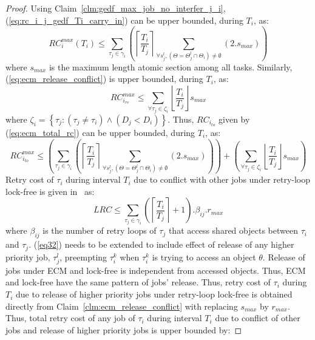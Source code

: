 \begin{proof}\normalfont
%
Using Claim~\ref{clm:gedf_max_job_no_interfer_j_i}, (\ref{eq:rc_i_j_gedf_Ti_carry_in}) can be upper bounded, during $T_i$, as:
%
\begin{equation*}
RC_{i}^{max}\left(T_{i}\right) \le \sum_{\tau_{j}\in\gamma_{i}}\left(\left\lceil\frac{T_{i}}{T_{j}}\right\rceil\sum_{\forall s_{j}^{l}, \left(\Theta=\Theta_j^l \cap \Theta_i\right) \neq \emptyset}\left(2.s_{max}\right)\right)
\label{eq30}
\end{equation*}
%
where $s_{max}$ is the maximum length atomic section among all tasks. Similarly, (\ref{eq:ecm_release_conflict}) is upper bounded, during $T_i$, as:
%
\begin{equation*}
RC_{i_{re}}^{max} \le \sum_{\forall \tau_j \in \zeta_i} \left\lfloor \frac{T_i}{T_j}\right\rfloor s_{max}
\label{eq:ecm_release_conflict_stm_comp}
\end{equation*}
%
where $\zeta_i=\left\{ \tau_j : \left(\tau_j \neq \tau_i \right) \wedge \left( D_j < D_i \right)\right\}$. Thus, $RC_{i_{to}}$ given by (\ref{eq:ecm_total_rc}) can be upper bounded, during $T_i$, as:
\begin{equation}
RC_{i_{to}}^{max} \le \left(\sum_{\tau_{j}\in\gamma_{i}}\left(\left\lceil\frac{T_{i}}{T_{j}}\right\rceil\sum_{\forall s_{j}^{l}, \left(\Theta=\Theta_j^l \cap \Theta_i\right) \neq \emptyset}\left(2.s_{max}\right)\right)\right) +
\left( \sum_{\forall \tau_j \in \zeta_i} \left\lfloor \frac{T_i}{T_j}\right\rfloor s_{max} \right)
\label{eq:ecm_total_rc_stm_comp}
\end{equation}
%
Retry cost of $\tau_i$ during interval $T_i$ due to conflict with other jobs under retry-loop lock-free is given in~\cite{key-5} as:
%
\begin{equation}
LRC \le \sum_{\tau_{j}\in\gamma_{i}}\left(\left\lceil\frac{T_{i}}{T_{j}}\right\rceil+1\right).\beta_{ij}.r_{max}
\label{eq32}
\end{equation}
%
where $\beta_{ij}$ is the number of retry loops of $\tau_{j}$ that access shared objects between $\tau_{i}$ and $\tau_j$. (\ref{eq32}) needs to be extended to include effect of release of any higher priority job, $\tau_j^l$, preempting $\tau_i^k$ when $\tau_i^k$ is trying to access an object $\theta$. Release of jobs under ECM and lock-free is independent from accessed objects. Thus, ECM and lock-free have the same pattern of jobs' release. Thus,  retry cost of $\tau_i$ during $T_i$ due to release of higher priority jobs under retry-loop lock-free is obtained directly from Claim~\ref{clm:ecm_release_conflict} with replacing $s_{max}$ by $r_{max}$. Thus, total retry cost of any job of $\tau_i$ during interval $T_i$ due to conflict of other jobs and release of higher priority jobs is upper bounded by:

\end{proof}

